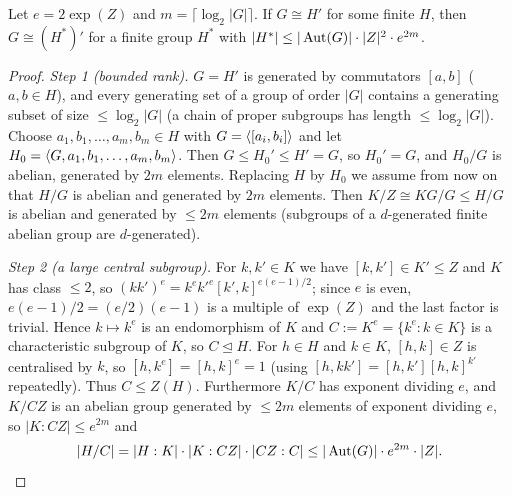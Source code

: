 \begin{theorem}\label{thm:2132A}
Let $e=2\exp(Z)$ and $m=\lceil\log_2|G|\rceil$. If $G\cong H'$ for some finite $H$, then $G\cong (H^*)'$ for a finite
group $H^*$ with $|H^*|\le|\operatorname{Aut}(G)|\cdot|Z|^2\cdot e^{2m}$.
\end{theorem}

\begin{proof}
\emph{Step 1 (bounded rank).} $G=H'$ is generated by commutators $[a,b]$ ($a,b\in H$), and every generating set of a
group of order $|G|$ contains a generating subset of size $\le\log_2|G|$ (a chain of proper subgroups has length
$\le\log_2|G|$). Choose $a_1,b_1,\dots,a_m,b_m\in H$ with $G=\langle [a_i,b_i]\rangle$ and let
$H_0=\langle G,a_1,b_1,\dots,a_m,b_m\rangle$. Then $G\le H_0'\le H'=G$, so $H_0'=G$, and $H_0/G$ is abelian, generated by
$2m$ elements. Replacing $H$ by $H_0$ we assume from now on that $H/G$ is abelian and generated by $2m$ elements.
Then $K/Z\cong KG/G\le H/G$ is abelian and generated by $\le 2m$ elements (subgroups of a $d$-generated finite
abelian group are $d$-generated).

\emph{Step 2 (a large central subgroup).} For $k,k'\in K$ we have $[k,k']\in K'\le Z$ and $K$ has class $\le 2$, so
$(kk')^e=k^ek'^e[k',k]^{e(e-1)/2}$; since $e$ is even, $e(e-1)/2=(e/2)(e-1)$ is a multiple of $\exp(Z)$ and the
last factor is trivial. Hence $k\mapsto k^e$ is an endomorphism of $K$ and $C:=K^e=\{k^e:k\in K\}$ is a
characteristic subgroup of $K$, so $C\trianglelefteq H$. For $h\in H$ and $k\in K$, $[h,k]\in Z$ is centralised by
$k$, so $[h,k^e]=[h,k]^e=1$ (using $[h,kk']=[h,k'][h,k]^{k'}$ repeatedly). Thus $C\le Z(H)$. Furthermore $K/C$ has
exponent dividing $e$, and $K/CZ$ is an abelian group generated by $\le 2m$ elements of exponent dividing $e$, so
$|K:CZ|\le e^{2m}$ and
\begin{equation}\label{eq:2132bound}
|H/C|=|H:K|\cdot|K:CZ|\cdot|CZ:C|\le|\operatorname{Aut}(G)|\cdot e^{2m}\cdot|Z|.
\end{equation}


\end{proof}
